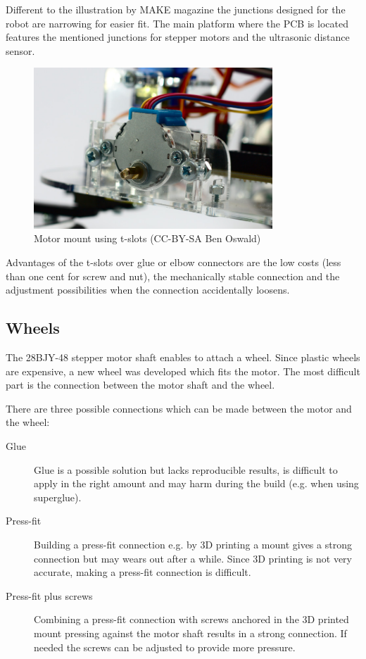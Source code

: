 Different to the illustration by MAKE magazine the junctions designed for the robot are narrowing for easier fit. The main platform where the PCB is located features the mentioned junctions for stepper motors and the ultrasonic distance sensor.

\begin{figure}[H]
  \centering
  \includegraphics[width=0.8\textwidth]{images/30_motormount1.jpg}
  \caption{Motor mount using t-slots (CC-BY-SA Ben Oswald)}
\end{figure}

Advantages of the t-slots over glue or elbow connectors are the low costs (less than one cent for screw and nut), the mechanically stable connection and the adjustment possibilities when the connection accidentally loosens. 
 
\subsection{Wheels}

The 28BJY-48 stepper motor shaft enables to attach a wheel. Since plastic wheels are expensive, a new wheel was developed which fits the motor. The most difficult part is the connection between the motor shaft and the wheel.

There are three possible connections which can be made between the motor and the wheel:
\begin{description}
\item[Glue] Glue is a possible solution but lacks reproducible results, is difficult to apply in the right amount and may harm during the build (e.g. when using superglue).
\item[Press-fit] Building a press-fit connection e.g. by 3D printing a mount gives a strong connection but may wears out after a while. Since 3D printing is not very accurate, making a press-fit connection is difficult.
\item[Press-fit plus screws] Combining a press-fit connection with screws anchored in the 3D printed mount pressing against the motor shaft results in a strong connection. If needed the screws can be adjusted to provide more pressure.
\end{description}

